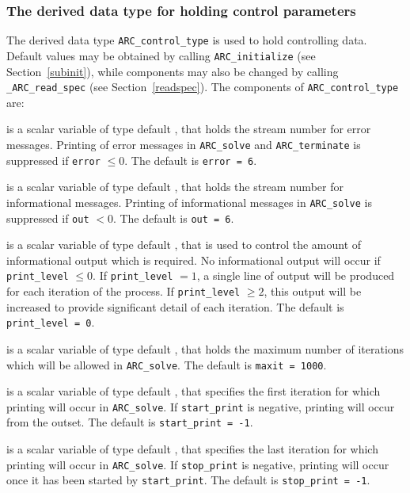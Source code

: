 \documentclass{galahad}
\newcommand{\packagename}{ARC}
\newcommand{\fullpackagename}{\libraryname\_\packagename}
\begin{document}
\subsubsection{The derived data type for holding control
 parameters}\label{typecontrol}
The derived data type
{\tt \packagename\_control\_type}
is used to hold controlling data. Default values may be obtained by calling
{\tt \packagename\_initialize}
(see Section~\ref{subinit}),
while components may also be changed by calling
{\tt \fullpackagename\_read\-\_spec}
(see Section~\ref{readspec}).
The components of
{\tt \packagename\_control\_type}
are:


\begin{description}

 is a scalar variable of type default \integer, that holds the
stream number for error messages. Printing of error messages in
{\tt \packagename\_solve} and {\tt \packagename\_terminate}
is suppressed if {\tt error} $\leq 0$.
The default is {\tt error = 6}.

 is a scalar variable of type default \integer, that holds the
stream number for informational messages. Printing of informational messages in
{\tt \packagename\_solve} is suppressed if {\tt out} $< 0$.
The default is {\tt out = 6}.

 is a scalar variable of type default \integer, that is used
to control the amount of informational output which is required. No
informational output will occur if {\tt print\_level} $\leq 0$. If
{\tt print\_level} $= 1$, a single line of output will be produced for each
iteration of the process. If {\tt print\_level} $\geq 2$, this output will be
increased to provide significant detail of each iteration.
The default is {\tt print\_level = 0}.

 is a scalar variable of type default \integer, that holds the
maximum number of iterations which will be allowed in {\tt \packagename\_solve}.
The default is {\tt maxit = 1000}.

 is a scalar variable of type default \integer, that specifies
the first iteration for which printing will occur in {\tt \packagename\_solve}.
If {\tt start\_print} is negative, printing will occur from the outset.
The default is {\tt start\_print = -1}.

 is a scalar variable of type default \integer, that specifies
the last iteration for which printing will occur in  {\tt \packagename\_solve}.
If {\tt stop\_print} is negative, printing will occur once it has been
started by {\tt start\_print}.
The default is {\tt stop\_print = -1}.


\end{description}
\end{document}
